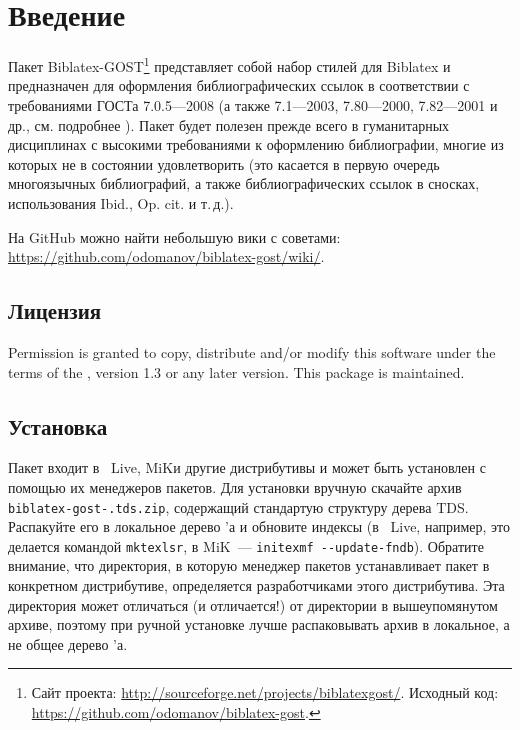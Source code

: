 \documentclass[10pt,a4paper,headings=small,numbers=enddot,english,russian]{ltxdockit}
\newcommand*{\biblatex}{Biblatex\xspace}
\newcommand*{\biblatexgost}{Biblatex-GOST\xspace}
\begin{document}
\printtitlepage
\tableofcontents
\listoftables

\section{Введение}
\label{sec:int}

Пакет \biblatexgost{}\footnote{Сайт проекта:
  \url{http://sourceforge.net/projects/biblatexgost/}. Исходный код:
  \url{https://github.com/odomanov/biblatex-gost}.} представляет собой
набор стилей для
\biblatex{}\unspace{}
и предназначен для оформления библиографических ссылок в соответствии
с требованиями ГОСТа 7.0.5---2008 (а также 7.1---2003, 7.80---2000,
7.82---2001 и др., см. подробнее ).
Пакет будет полезен прежде всего в гуманитарных дисциплинах с высокими
требованиями к оформлению библиографии, многие из которых \bibtex не в
состоянии удовлетворить (это касается в первую очередь многоязычных
библиографий, а также библиографических ссылок в сносках,
использования Ibid., Op. cit. и т.\,д.).

На GitHub можно найти небольшую вики с советами:
\url{https://github.com/odomanov/biblatex-gost/wiki/}.

\subsection{Лицензия}
\label{sec:lic}

Permission is granted to copy, distribute and\slash or modify this software under the
terms of the \lppl, version 1.3 or any later
version.
This package is
maintained.

\subsection{Установка}
\label{sec:install}

Пакет входит в \tex~Live, MiK\tex и другие дистрибутивы и может быть установлен
с помощью их менеджеров пакетов. Для установки вручную скачайте архив
\texttt{biblatex-gost-.tds.zip}, содержащий стандартую структуру дерева TDS.
Распакуйте его в локальное дерево \tex'а и
обновите индексы (в \tex~Live, например, это делается командой \texttt{mktexlsr},
в MiK\tex~--- \texttt{initexmf -{}-update-fndb}). Обратите внимание, что директория,
в которую менеджер пакетов устанавливает пакет в конкретном дистрибутиве,
определяется разработчиками этого дистрибутива.
Эта директория может отличаться (и отличается!) от директории
в вышеупомянутом архиве, поэтому при ручной установке лучше распаковывать
архив в локальное, а не общее дерево \tex'а.
\end{document}
